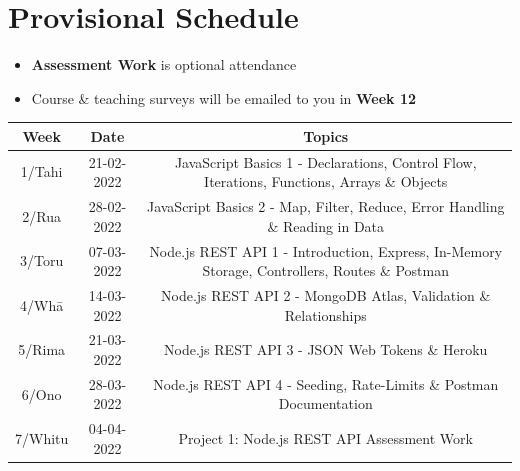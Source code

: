 \documentclass{article}
\begin{document}
\section*{Provisional Schedule}

\begin{itemize}
	\item \textbf{Assessment Work} is optional attendance
	\item Course \& teaching surveys will be emailed to you in \textbf{Week 12}
\end{itemize}

\renewcommand{\arraystretch}{1.5}
\begin{tabular}{|c|c|c|c|}
	\hline
	\textbf{Week}                  & \textbf{Date}            & \multicolumn{2}{c|}{\textbf{Topics}}                                                                                             \\ \hline
	\footnotesize 1/Tahi           & \footnotesize 21-02-2022 & \multicolumn{2}{c|}{\footnotesize JavaScript Basics 1 - Declarations, Control Flow, Iterations, Functions, Arrays \& Objects}    \\ \hline
	\footnotesize 2/Rua            & \footnotesize 28-02-2022 & \multicolumn{2}{c|}{\footnotesize JavaScript Basics 2 - Map, Filter, Reduce, Error Handling \& Reading in Data}                  \\ \hline
	\footnotesize 3/Toru           & \footnotesize 07-03-2022 & \multicolumn{2}{c|}{\footnotesize Node.js REST API 1 - Introduction, Express, In-Memory Storage, Controllers, Routes \& Postman} \\ \hline
	\footnotesize 4/Whā            & \footnotesize 14-03-2022 & \multicolumn{2}{c|}{\footnotesize Node.js REST API 2 - MongoDB Atlas, Validation \& Relationships}                               \\ \hline
	\footnotesize 5/Rima           & \footnotesize 21-03-2022 & \multicolumn{2}{c|}{\footnotesize Node.js REST API 3 - JSON Web Tokens \& Heroku}                                                \\ \hline
	\footnotesize 6/Ono            & \footnotesize 28-03-2022 &  \multicolumn{2}{c|}{\footnotesize Node.js REST API 4 - Seeding, Rate-Limits \& Postman Documentation}                            \\ \hline
	\footnotesize 7/Whitu          & \footnotesize 04-04-2022 & \multicolumn{2}{c|}{\footnotesize Project 1: Node.js REST API Assessment Work}                                                   \\ \hline

\end{tabular}
\end{document}
